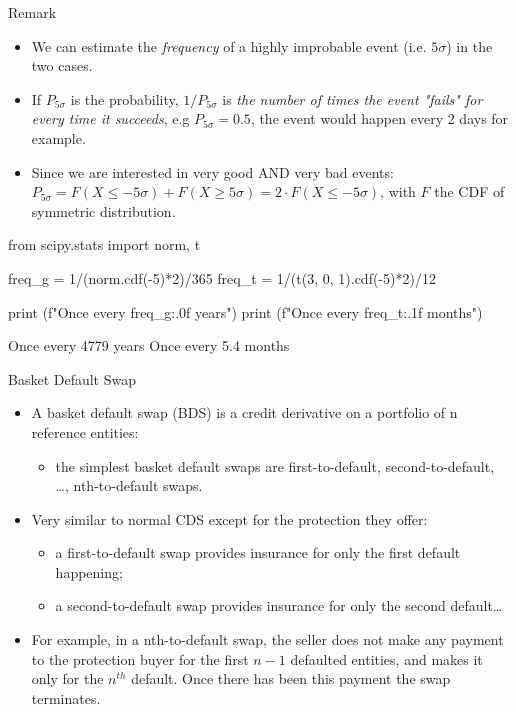\documentclass{beamer}
\begin{document}
\begin{frame}[fragile]{Remark}
\begin{itemize}
	\item We can estimate the \emph{frequency} of a highly improbable event (i.e. $5\sigma$) in the two cases.
	\item If $P_{5\sigma}$ is the probability, $1/P_{5\sigma}$ is \emph{the number of times the event "fails" for every time it succeeds}, e.g $P_{5\sigma}=0.5$, the event would happen every 2 days for example.
	\item Since we are interested in very good AND very bad events:
	$P_{5\sigma} = F(X\leq-5\sigma) + F(X\geq5\sigma) = 2\cdot F(X\leq-5\sigma)$, with $F$ the CDF of symmetric distribution. 
\end{itemize}
 \begin{ipython}
from scipy.stats import norm, t
			
freq_g = 1/(norm.cdf(-5)*2)/365
freq_t = 1/(t(3, 0, 1).cdf(-5)*2)/12
			
print (f"Once every {freq_g:.0f} years")
print (f"Once every {freq_t:.1f} months")
\end{ipython}
\begin{ioutput}
Once every 4779 years
Once every 5.4 months
\end{ioutput}
\end{frame}

\begin{frame}{Basket Default Swap}
  \begin{itemize}
  \item A basket default swap (BDS) is a credit derivative on a portfolio of n reference entities:
    \begin{itemize}
      \item the simplest basket default swaps are first-to-default, second-to-default, \ldots, nth-to-default swaps. 
    \end{itemize}
  \item Very similar to normal CDS except for the protection they offer:
    \begin{itemize}
      \item a first-to-default swap provides insurance for only the first default happening;
      \item a second-to-default swap provides insurance for only the second default\ldots
    \end{itemize}
  \item For example, in a nth-to-default swap, the seller does not make any payment to the protection buyer for the first $n-1$ defaulted entities, and makes it only for the $n^{th}$ default. Once there has been this payment the swap terminates.
  \end{itemize}
\end{frame}
\end{document}
